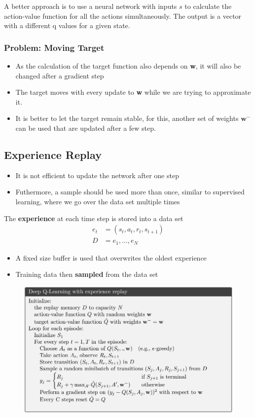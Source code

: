 A better approach is to use a neural network with inputs \(s\) to calculate the action-value function for all the actions simultaneously.
The output is a vector with a different q values for a given state.


\subsubsection{Problem: Moving Target}
\begin{itemize}
    \item As the calculation of the target function also depends on \textbf{w}, it will also be changed after a gradient step
    \item The target moves with every update to \textbf{w} while we are trying to approximate it.
    \item It is better to let the target remain stable, for this, another set of weights \(\boldsymbol{w}^-\) can be used that are updated after a few step.
\end{itemize}

\subsection{Experience Replay}
\begin{itemize}
    \item It is not efficient to update the network after one step
    \item Futhermore, a sample should be used more than once, similar to supervised learning, where we go over the data set multiple times
\end{itemize}
The \textbf{experience} at each time step is stored into a data set
\begin{align*}
    e_t &= (s_t, a_t, r_t, s_{t+1})\\
    D &= e_1, \dots, e_N
\end{align*}
\begin{itemize}
    \item A fixed size buffer is used that overwrites the oldest experience
    \item Training data then \textbf{sampled} from the data set
\end{itemize}
\begin{figure}[!h]
    \includegraphics[width = \columnwidth]{figures/DeepReinforcementLearning2/DeepQLearningExperienceReplay.png}
\end{figure}

